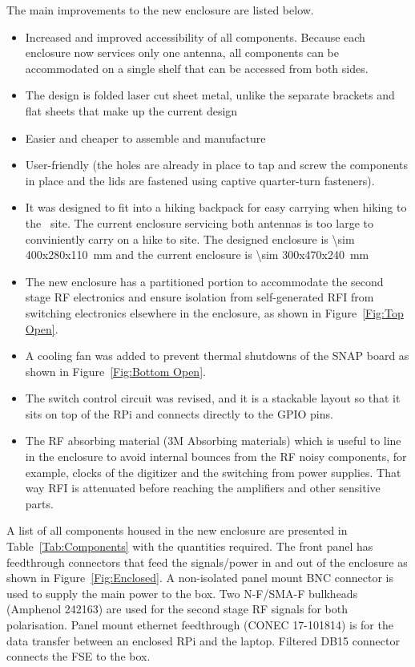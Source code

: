 The main improvements to the new enclosure are listed below.

\begin{itemize}
	\item Increased and improved accessibility of all components. Because each enclosure now services only one antenna, all components can be accommodated on a single shelf that can be accessed from both sides.
	\item The design is folded laser cut sheet metal, unlike the separate brackets and flat sheets that make up the current design
	\item Easier and cheaper to assemble and manufacture
	\item User-friendly (the holes are already in place to tap and screw the components in place and the lids are fastened using captive quarter-turn fasteners).
	\item It was designed to fit into a hiking backpack for easy carrying when hiking to the \prizm\ site. The current enclosure servicing both antennas is too large to conviniently carry on a hike to site. The designed enclosure is \SI{\sim 400x280x110}{\milli \meter} and the current enclosure is \SI{\sim 300x470x240}{\milli \meter} 
	\item The new enclosure has a partitioned portion to accommodate the second stage RF electronics and ensure isolation from self-generated RFI from switching electronics elsewhere in the enclosure, as shown in Figure~\ref{Fig:Top Open}.
	\item A cooling fan was added to prevent thermal shutdowns of the SNAP board as shown in Figure~\ref{Fig:Bottom Open}.
	\item The switch control circuit was revised, and it is a stackable layout so that it sits on top of the RPi and connects directly to the GPIO pins.
    \item The RF absorbing material (3M Absorbing materials) which is useful to line in the enclosure to avoid internal bounces from the RF noisy components, for example, clocks of the digitizer and the switching from power supplies. That way RFI is attenuated before reaching the amplifiers and other sensitive parts. 
\end{itemize}

A list of all components housed in the new enclosure are presented in Table~\ref{Tab:Components} with the quantities required. The front panel has feedthrough connectors that feed the signals/power in and out of the enclosure as shown in Figure~\ref{Fig:Enclosed}. A non-isolated panel mount BNC connector is used to supply the main power to the box. Two N-F/SMA-F bulkheads (Amphenol 242163) are used for the second stage RF signals for both polarisation. Panel mount ethernet feedthrough (CONEC 17-101814) is for the data transfer between an enclosed RPi and the laptop. Filtered DB15 connector connects the FSE to the box.

